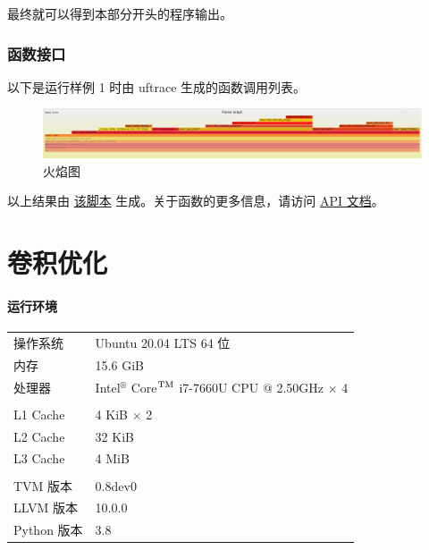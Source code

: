 \documentclass[UTF8]{ctexart}
\begin{document}
最终就可以得到本部分开头的程序输出。

\section{函数接口}

以下是运行样例 1 时由 uftrace\cite{uft} 生成的函数调用列表。


\begin{figure}[H]
    \centering
        \includegraphics[width=\textwidth]{img/flame.png}
    \caption{火焰图\cite{flame}}
    \label{fig:flame}
\end{figure}

以上结果由 \href{run:../opg/uftrace.sh}{该脚本} 生成。关于函数的更多信息，请访问 \href{run:../opg/target/doc/opg/index.html}{API 文档}。%

\vspace*{5em}

\part{卷积优化}
\subsection*{运行环境}
\begin{tabular}{ll}
    操作系统 & Ubuntu 20.04 LTS 64 位\\
    内存 & 15.6 GiB \\
    处理器 & Intel$^\circledR$ Core$^{\rm TM}$ i7-7660U CPU @ 2.50GHz $\times$ 4\\
    &\\
    L1 Cache & 4 KiB $\times$ 2 \\
    L2 Cache & 32 KiB \\
    L3 Cache & 4 MiB \\
    &\\
    TVM 版本 & 0.8dev0 \\
    LLVM 版本 & 10.0.0 \\
    Python 版本 & 3.8 \\
\end{tabular}
\end{document}
